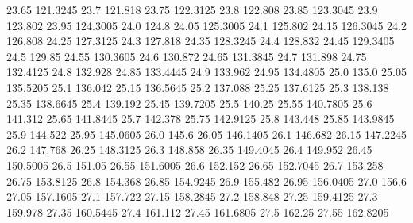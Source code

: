           23.65         121.3245
           23.7          121.818
          23.75         122.3125
           23.8          122.808
          23.85         123.3045
           23.9          123.802
          23.95         124.3005
           24.0            124.8
          24.05         125.3005
           24.1          125.802
          24.15         126.3045
           24.2          126.808
          24.25         127.3125
           24.3          127.818
          24.35         128.3245
           24.4          128.832
          24.45         129.3405
           24.5           129.85
          24.55         130.3605
           24.6          130.872
          24.65         131.3845
           24.7          131.898
          24.75         132.4125
           24.8          132.928
          24.85         133.4445
           24.9          133.962
          24.95         134.4805
           25.0            135.0
          25.05         135.5205
           25.1          136.042
          25.15         136.5645
           25.2          137.088
          25.25         137.6125
           25.3          138.138
          25.35         138.6645
           25.4          139.192
          25.45         139.7205
           25.5           140.25
          25.55         140.7805
           25.6          141.312
          25.65         141.8445
           25.7          142.378
          25.75         142.9125
           25.8          143.448
          25.85         143.9845
           25.9          144.522
          25.95         145.0605
           26.0            145.6
          26.05         146.1405
           26.1          146.682
          26.15         147.2245
           26.2          147.768
          26.25         148.3125
           26.3          148.858
          26.35         149.4045
           26.4          149.952
          26.45         150.5005
           26.5           151.05
          26.55         151.6005
           26.6          152.152
          26.65         152.7045
           26.7          153.258
          26.75         153.8125
           26.8          154.368
          26.85         154.9245
           26.9          155.482
          26.95         156.0405
           27.0            156.6
          27.05         157.1605
           27.1          157.722
          27.15         158.2845
           27.2          158.848
          27.25         159.4125
           27.3          159.978
          27.35         160.5445
           27.4          161.112
          27.45         161.6805
           27.5           162.25
          27.55         162.8205
